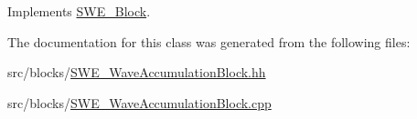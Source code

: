 Implements \hyperlink{classSWE__Block_ab2b4b659f23d5d45413dece8d2da3298}{S\-W\-E\-\_\-\-Block}.



The documentation for this class was generated from the following files\-:\begin{DoxyCompactItemize}
\item 
src/blocks/\hyperlink{SWE__WaveAccumulationBlock_8hh}{S\-W\-E\-\_\-\-Wave\-Accumulation\-Block.\-hh}\item 
src/blocks/\hyperlink{SWE__WaveAccumulationBlock_8cpp}{S\-W\-E\-\_\-\-Wave\-Accumulation\-Block.\-cpp}\end{DoxyCompactItemize}
